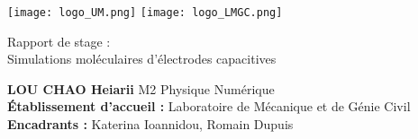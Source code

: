 \documentclass[class=article,crop=false]{standalone}
\begin{document}
\thispagestyle{empty}
\begin{titlepage}
    \begin{center}
        \texttt{[image: logo\_UM.png]} \hfill
        \texttt{[image: logo\_LMGC.png]}
    \end{center}
    \vspace*{\fill}
    \begin{center}
        Rapport de stage :\\ {\huge Simulations moléculaires d'électrodes capacitives}
    \end{center}
    \vfill
    \hspace*{.1\textwidth}
    \begin{minipage}{.8\textwidth}
        \large
        \raggedright
        \textbf{LOU CHAO Heiarii} M2 Physique Numérique\\
        \textbf{Établissement d'accueil :} Laboratoire de Mécanique et de Génie Civil\\
        \textbf{Encadrants :} Katerina Ioannidou, Romain Dupuis
    \end{minipage}
\end{titlepage}
\end{document}

